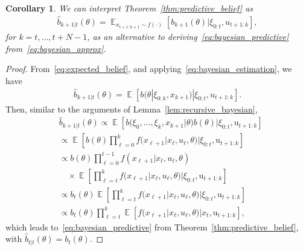 \documentclass[letterpaper, 10 pt, conference]{IEEEconf}
\newcommand{\Expectation}{\mathop{{}\mathbb{E}}}
\newtheorem{corollary}{Corollary}
\begin{document}
\begin{corollary} \label{cor:expected_belief}
    We can interpret Theorem~\ref{thm:predictive_belief} as
    \begin{align} \label{eq:expected_belief}
        \hat{b}_{k+1|t}(\theta) = \Expectation_{x_{t+1:k+1} \sim f(\cdot)}[b_{k+1}(\theta) | \xi_{0:t}, u_{t+1:k}],
    \end{align}
    for $k = t, \dots, t+N-1$,
    as an alternative to deriving~\eqref{eq:bayesian_predictive} from~\eqref{eq:bayesian_approx}.
\end{corollary}
\begin{proof}
    From~\eqref{eq:expected_belief}, and applying~\eqref{eq:bayesian_estimation}, we have 
    \begin{align*}
        \hat{b}_{k+1|t}(\theta) = \Expectation[b(\theta | \xi_{0:k}, x_{k+1}) | \xi_{0:t}, u_{t+1:k}].
    \end{align*}
    Then, similar to the arguments of Lemma~\ref{lem:recursive_bayesian},
    \begin{align*}
        & \hat{b}_{k+1|t}(\theta) \propto \Expectation[b(\xi_{0}, \dots, \xi_{k}, x_{k+1} | \theta) b(\theta) | \xi_{0:t}, \mathrm{u}_{t+1:k}] \\
        & \propto \Expectation[b(\theta) \prod_{\ell=0}^{k} f(x_{\ell+1} | x_{\ell}, u_{\ell}, \theta) | \xi_{0:t}, \mathrm{u}_{t+1:k}] \\
        & \propto b(\theta) \prod_{\ell=0}^{t-1} f(x_{\ell+1} | x_{\ell}, u_{\ell}, \theta) \\
        &\quad \times \Expectation[\prod_{\ell=t}^{k} f(x_{\ell+1} | x_{\ell}, u_{\ell}, \theta) | \xi_{0:t}, \mathrm{u}_{t+1:k}] \\
        & \propto b_{t}(\theta) \Expectation[\prod_{\ell=t}^{k} f(x_{\ell+1} | x_{\ell}, u_{\ell}, \theta) | \xi_{0:t}, \mathrm{u}_{t+1:k}] \\
        & \propto b_{t}(\theta) \prod_{\ell=t}^{k}  \Expectation[f(x_{\ell+1} | x_{\ell}, u_{\ell}, \theta) | x_{t}, \mathrm{u}_{t+1:k}],
    \end{align*}
    which leads to~\eqref{eq:bayesian_predictive} from Theorem~\ref{thm:predictive_belief}, with $\hat{b}_{t|t}(\theta) = b_{t}(\theta)$.
\end{proof}
\end{document}
